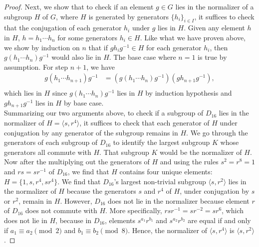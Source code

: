 \documentclass{article}
\begin{document}
\begin{enumerate}
\begin{enumerate}
\begin{proof}
          Next, we show that to check if an element $g\in G$ lies in the
          normalizer of a subgroup $H$ of $G$, where $H$ is generated by
          generators $\{h_i\}_{i\in I}$, it suffices to check that the
          conjugation of each generator $h_i$ under $g$ lies in $H$.
          Given any element $h$ in $H$, $h=h_1\cdots h_n$ for some
          generators $h_i\in H$. Like what we have proven above, we show by
          induction on $n$ that if $gh_ig^{-1}\in H$ for each generator
          $h_i$, then $g(h_1\cdots h_n)g^{-1}$ would also lie in $H$. The
          base case where $n=1$ is true by assumption. For step $n+1$, we
          have
          \begin{align*}
            g(h_1\cdots h_{n+1})g^{-1}  &= (g(h_1\cdots
                                        h_n)g^{-1})(gh_{n+1}g^{-1}), \\
          \end{align*}
          which lies in $H$ since $g(h_1\cdots h_n)g^{-1}$ lies in $H$ by
          induction hypothesis and $gh_{n+1}g^{-1}$ lies in $H$ by base
          case. \\

          Summarizing our two arguments above, to check if a subgroup of
          $D_{16}$ lies in the normalizer of $H=\langle s,r^4\rangle$, it
          suffices to check that each generator of $H$ under conjugation by
          any generator of the subgroup remains in $H$. We go through
          the generators of each subgroup of $D_{16}$ to identify the
          largest subgroup $K$ whose generators all commute with $H$. That
          subgroup $K$ would be the normalizer of $H$. \\

          Now after the multiplying out the generators of $H$ and using the
          rules $s^2=r^8=1$ and $rs=sr^{-1}$ of $D_{16}$, we find that $H$
          contains four unique elements: $H=\{1,s,r^4,sr^4\}$. We find that
          $D_{16}$'s largest non-trivial subgroup $\langle s,r^2\rangle$
          lies in the normalizer of $H$ because the generators $s$ and $r^4$
          of $H$, under conjugation by $s$ or $r^2$, remain in $H$.
          However, $D_{16}$ does not lie in the normalizer because
          element $r$ of $D_{16}$ does not commute with $H$. More
          specifically, $rsr^{-1}=sr^{-2}=sr^6$, which does not lie in $H$,
          because in $D_{16}$, elements $s^{a_1}r^{b_1}$ and
          $s^{a_2}r^{b_2}$ are equal if and only if $a_1\equiv a_2\pmod{2}$
          and $b_1\equiv b_2\pmod{8}$. Hence, the normalizer of $\langle
          s,r^4\rangle$ is $\langle s,r^2\rangle$.
        \end{proof}
    \end{enumerate}


\end{enumerate}
\end{document}
